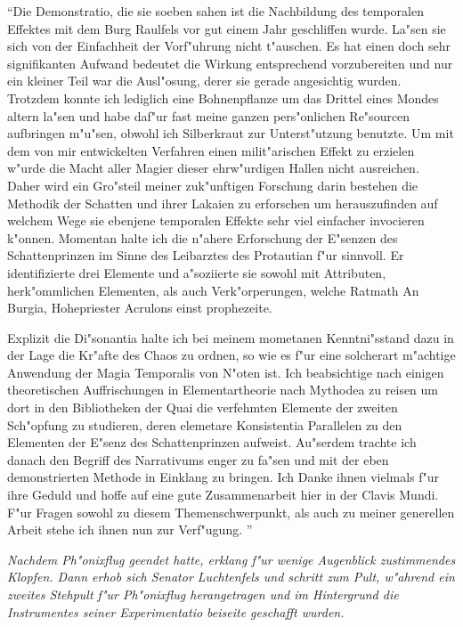 \documentclass[a5paper,8pt]{book}
\begin{document}
``Die Demonstratio, die sie soeben sahen ist die Nachbildung des temporalen Effektes mit dem Burg Raulfels vor gut einem Jahr geschliffen wurde. La"sen sie sich von der Einfachheit der Vorf"uhrung nicht t"auschen. Es hat einen doch sehr signifikanten Aufwand bedeutet die Wirkung entsprechend vorzubereiten und nur ein kleiner Teil war die Ausl"osung, derer sie gerade angesichtig wurden. Trotzdem konnte ich lediglich eine Bohnenpflanze um das Drittel eines Mondes altern la"sen und habe daf"ur fast meine ganzen pers"onlichen Re"sourcen aufbringen m"u"sen, obwohl ich Silberkraut zur Unterst"utzung benutzte.
Um mit dem von mir entwickelten Verfahren einen milit"arischen Effekt zu erzielen w"urde die Macht aller Magier dieser ehrw"urdigen Hallen nicht ausreichen.
Daher wird ein Gro"steil meiner zuk"unftigen Forschung darin bestehen die Methodik der Schatten und ihrer Lakaien zu erforschen um herauszufinden auf welchem Wege sie ebenjene temporalen Effekte sehr viel einfacher invocieren k"onnen.
Momentan halte ich die n"ahere Erforschung der E"senzen des Schattenprinzen im Sinne des Leibarztes des Protautian f"ur sinnvoll. Er identifizierte drei Elemente und a"soziierte sie sowohl mit Attributen, herk"ommlichen Elementen, als auch Verk"orperungen, welche Ratmath An Burgia, Hohepriester Acrulons einst prophezeite.

Explizit die Di"sonantia halte ich bei meinem mometanen Kenntni"sstand dazu in der Lage die Kr"afte des Chaos zu ordnen, so wie es f"ur eine solcherart m"achtige Anwendung der Magia Temporalis von N"oten ist.
Ich beabsichtige nach einigen theoretischen Auffrischungen in Elementartheorie nach Mythodea zu reisen um dort in den Bibliotheken der Quai die verfehmten Elemente der zweiten Sch"opfung zu studieren, deren elemetare Konsistentia Parallelen zu den Elementen der E"senz des Schattenprinzen aufweist.
Au"serdem trachte ich danach den Begriff des Narrativums enger zu fa"sen und mit der eben demonstrierten Methode in Einklang zu bringen.
Ich Danke ihnen vielmals f"ur ihre Geduld und hoffe auf eine gute Zusammenarbeit hier in der Clavis Mundi.
F"ur Fragen sowohl zu diesem Themenschwerpunkt, als auch zu meiner generellen Arbeit stehe ich ihnen nun zur Verf"ugung. ''

\textit{Nachdem Ph"onixflug geendet hatte, erklang f"ur wenige Augenblick zustimmendes Klopfen. Dann erhob sich Senator Luchtenfels und schritt zum Pult, w"ahrend ein zweites Stehpult f"ur Ph"onixflug herangetragen und im Hintergrund die Instrumentes seiner Experimentatio beiseite geschafft wurden.}
\end{document}
